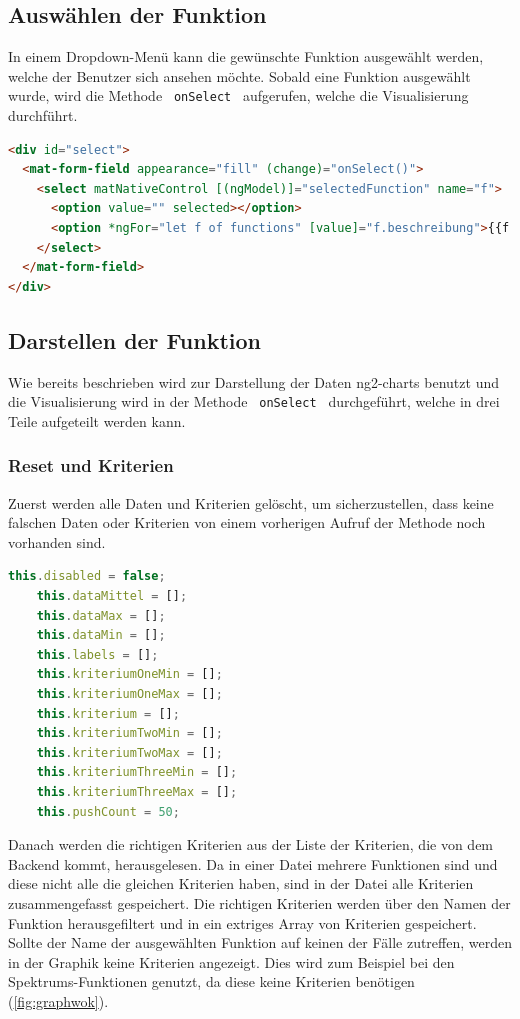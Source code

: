 \subsection{Auswählen der Funktion}
In einem Dropdown-Menü kann die gewünschte Funktion ausgewählt werden, welche der Benutzer sich ansehen möchte. Sobald eine Funktion
ausgewählt wurde, wird die Methode \lstinline | onSelect | aufgerufen, welche die Visualisierung durchführt.

\begin{lstlisting}[language=HTML, caption={Dropdown-Menü für die Funktionen}]
<div id="select">
  <mat-form-field appearance="fill" (change)="onSelect()">
    <select matNativeControl [(ngModel)]="selectedFunction" name="f">
      <option value="" selected></option>
      <option *ngFor="let f of functions" [value]="f.beschreibung">{{f.beschreibung}}</option>
    </select>
  </mat-form-field>
</div>
\end{lstlisting}

\subsection{Darstellen der Funktion}
Wie bereits beschrieben wird zur Darstellung der Daten ng2-charts benutzt und die Visualisierung wird in der Methode
\lstinline | onSelect | durchgeführt, welche in drei Teile aufgeteilt werden kann.

\subsubsection{Reset und Kriterien}
Zuerst werden alle Daten und Kriterien gelöscht, um sicherzustellen, dass keine falschen Daten oder Kriterien von einem vorherigen 
Aufruf der Methode noch vorhanden sind.

\begin{lstlisting}[language=Typescript, caption={Zurücksetzen der Daten}]
    this.disabled = false;
    this.dataMittel = [];
    this.dataMax = [];
    this.dataMin = [];
    this.labels = [];
    this.kriteriumOneMin = [];
    this.kriteriumOneMax = [];
    this.kriterium = [];
    this.kriteriumTwoMin = [];
    this.kriteriumTwoMax = [];
    this.kriteriumThreeMin = [];
    this.kriteriumThreeMax = [];
    this.pushCount = 50;
\end{lstlisting}

Danach werden die richtigen Kriterien aus der Liste der Kriterien, die von dem Backend kommt, herausgelesen. Da in einer Datei mehrere
Funktionen sind und diese nicht alle die gleichen Kriterien haben, sind in der Datei alle Kriterien zusammengefasst gespeichert. Die 
richtigen Kriterien werden über den Namen der Funktion herausgefiltert und in ein extriges Array von Kriterien gespeichert. Sollte 
der Name der ausgewählten Funktion auf keinen der Fälle zutreffen, werden in der Graphik keine Kriterien angezeigt. Dies wird zum 
Beispiel bei den Spektrums-Funktionen genutzt, da diese keine Kriterien benötigen (\ref{fig:graphwok}).

